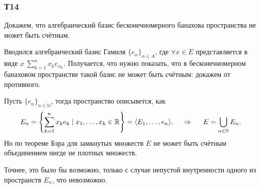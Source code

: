 \subsubsection*{Т14}

Докажем, что алгебраический базис бесконечномерного банахова пространства не может быть счётным. 

Вводился алгебраический базис Гамиля $\{e_\alpha\}_{\alpha\in A}$, где $\forall x \in E$ представляется в виде
$x \ \sum_{k=1}^{n}  x_k e_{\alpha_k}$. Получается, что нужно показать, что в бесконечномерном банаховом пространстве такой базис не может быть счётным: докажем от противного.


Пусть $\{e_n\}_{n\in \mathbb{N}}$, тогда пространство описывется, как
\begin{equation*}
    E_n = \left\{
        \sum_{k=1}^{n} x_k e_k \mid x_1, \ldots, x_k \in \mathbb{R}
    \right\} = \langle E_1, \ldots, e_n \rangle,
    \hspace{0.5cm} \Rightarrow \hspace{0.5cm}
    E = \bigcup_{n\in \mathbb{N} } E_n.
\end{equation*}
Но по теореме Бэра для замкнутых множеств $E$ не может быть счётным объединением нигде не плотных множеств.

Точнее, это было бы возможно, только с случае непустой внутренности одного из пространств $E_n$, что невозможно. 



